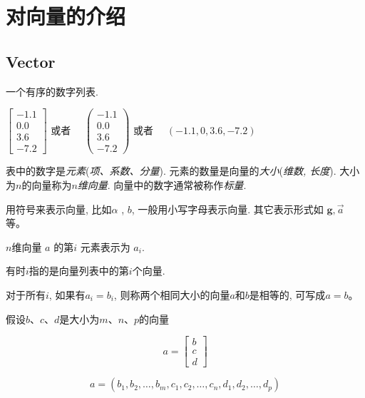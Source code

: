 \chapter{对向量的介绍}

\section{Vector}

\begin{definition}[Vector]
    一个有序的数字列表.

    \( \left[\begin{array}{c}-1.1 \\ 0.0 \\ 3.6 \\ -7.2\end{array}\right] \) 或者 \( \quad\left(\begin{array}{c}-1.1 \\ 0.0 \\ 3.6 \\ -7.2\end{array}\right) \) 或者 \( \quad(-1.1,0,3.6,-7.2) \)
\end{definition}

表中的数字是\textit{元素}(\textit{项、系数、分量}). 元素的数量是向量的\textit{大小}(\textit{维数, 长度}). 大小为$n$的向量称为\textit{$n$维向量}. 
向量中的数字通常被称作\textit{标量}. 

用符号来表示向量, 比如$\alpha$ , $b$, 一般用小写字母表示向量. 其它表示形式如 $\boldsymbol{g}, \vec{a}$ 等。

\begin{definition}[n维向量 \( a \) 的第 \( i \) 元素]
    $n$维向量 \( a \) 的第\( i \) 元素表示为 \( a_{i} \).

    有时$i$指的是向量列表中的第$i$个向量.
\end{definition}

\begin{definition}[$a=b$]
    对于所有$i$, 如果有$a_i = b_i$, 则称两个相同大小的向量$a$和$b$是相等的, 可写成$a = b$。
\end{definition}

\begin{definition}
    假设$b$、$c$、$d$是大小为$m$、$n$、$p$的向量
    
    $$ a=\left[\begin{array}{l}b \\ c \\ d\end{array}\right] $$

    $$ a=\left(b_{1}, b_{2}, \ldots, b_{m}, c_{1}, c_{2}, \ldots, c_{n}, d_{1}, d_{2}, \ldots, d_{p}\right) $$
\end{definition}

